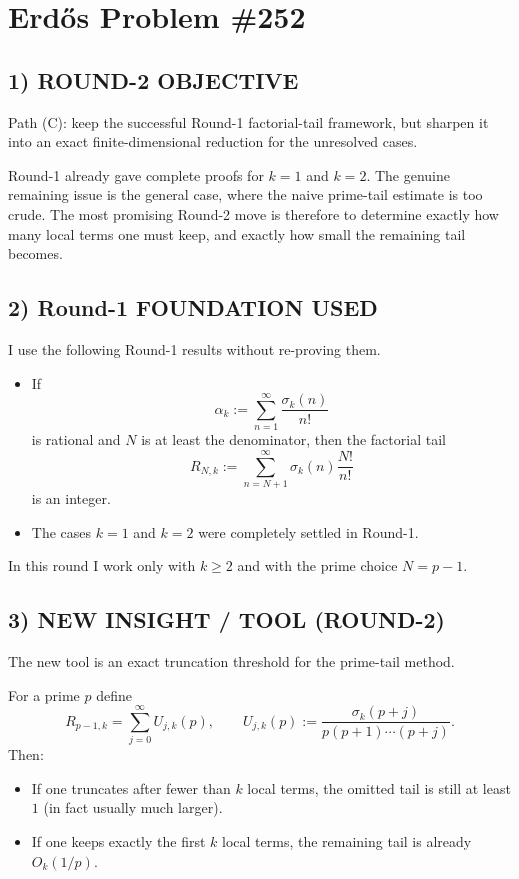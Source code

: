 \section{Erd\H{o}s Problem \#252}

\subsection*{1) ROUND-2 OBJECTIVE}
Path (C): keep the successful Round-1 factorial-tail framework, but sharpen it into an exact finite-dimensional reduction for the unresolved cases.

Round-1 already gave complete proofs for $k=1$ and $k=2$. The genuine remaining issue is the general case, where the naive prime-tail estimate is too crude. The most promising Round-2 move is therefore to determine exactly how many local terms one must keep, and exactly how small the remaining tail becomes.

\subsection*{2) Round-1 FOUNDATION USED}
I use the following Round-1 results without re-proving them.

\begin{itemize}
\item If
\[
\alpha_k:=\sum_{n=1}^{\infty}\frac{\sigma_k(n)}{n!}
\]
is rational and $N$ is at least the denominator, then the factorial tail
\[
R_{N,k}:=\sum_{n=N+1}^{\infty}\sigma_k(n)\frac{N!}{n!}
\]
is an integer.
\item The cases $k=1$ and $k=2$ were completely settled in Round-1.
\end{itemize}

In this round I work only with $k\ge 2$ and with the prime choice $N=p-1$.

\subsection*{3) NEW INSIGHT / TOOL (ROUND-2)}
The new tool is an exact truncation threshold for the prime-tail method.

For a prime $p$ define
\[
R_{p-1,k}=\sum_{j=0}^{\infty}U_{j,k}(p),
\qquad
U_{j,k}(p):=\frac{\sigma_k(p+j)}{p(p+1)\cdots(p+j)}.
\]
Then:

\begin{itemize}
\item If one truncates after fewer than $k$ local terms, the omitted tail is still at least $1$ (in fact usually much larger).
\item If one keeps exactly the first $k$ local terms, the remaining tail is already $O_k(1/p)$.
\end{itemize}

